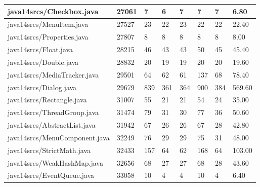 \begin{tabular}{|l|l|l|l|l|l|l|l|}
\hline
java14srcs/Checkbox.java                           & 27061       & 7         & 6         & 7         & 7         & 7         & 6.80      \\
\hline
java14srcs/MenuItem.java                           & 27527       & 23        & 22        & 23        & 22        & 22        & 22.40     \\
\hline
java14srcs/Properties.java                         & 27807       & 8         & 8         & 8         & 8         & 8         & 8.00      \\
\hline
java14srcs/Float.java                              & 28215       & 46        & 43        & 43        & 50        & 45        & 45.40     \\
\hline
java14srcs/Double.java                             & 28832       & 20        & 19        & 19        & 20        & 20        & 19.60     \\
\hline
java14srcs/MediaTracker.java                       & 29501       & 64        & 62        & 61        & 137       & 68        & 78.40     \\
\hline
java14srcs/Dialog.java                             & 29679       & 839       & 361       & 364       & 900       & 384       & 569.60    \\
\hline
java14srcs/Rectangle.java                          & 31007       & 55        & 21        & 21        & 54        & 24        & 35.00     \\
\hline
java14srcs/ThreadGroup.java                        & 31474       & 79        & 31        & 30        & 77        & 36        & 50.60     \\
\hline
java14srcs/AbstractList.java                       & 31942       & 67        & 26        & 26        & 67        & 28        & 42.80     \\
\hline
java14srcs/MenuComponent.java                      & 32249       & 76        & 29        & 29        & 75        & 31        & 48.00     \\
\hline
java14srcs/StrictMath.java                         & 32433       & 157       & 64        & 62        & 168       & 64        & 103.00    \\
\hline
java14srcs/WeakHashMap.java                        & 32656       & 68        & 27        & 27        & 68        & 28        & 43.60     \\
\hline
java14srcs/EventQueue.java                         & 33058       & 10        & 4         & 4         & 10        & 4         & 6.40      \\

\end{tabular}
